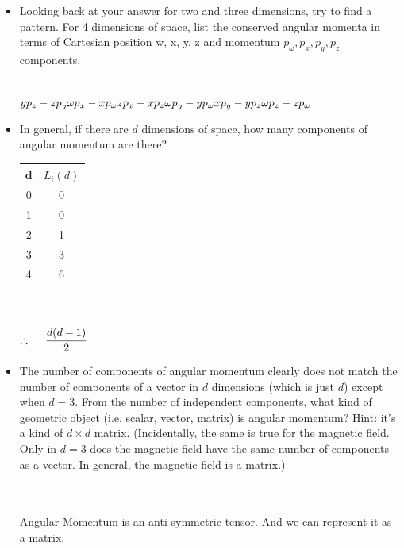 \documentclass[fleqn]{article}
\begin{document}
\begin{enumerate}
\begin{itemize}
      \item Looking back at your answer for two and three dimensions, try
      to find a pattern. For 4 dimensions of space, list the conserved
      angular momenta in terms of Cartesian position w, x, y, z and momentum $p_{\omega}, p_x, p_y,p_z$ components.

        \textcolor{hwColor}{
          \\
          $
            y p_z-z p_y \omega p_x-x p_{\omega}
            \\
            \\
            z p_x -x p_z \omega p_y - y p_{\omega}
            \\
            \\
            x p_y -y p_z \omega p_z -z p_{\omega}
          $
          \\
        }
  
      \item In general, if there are $d$ dimensions of space, how many components of angular momentum are there?

        \textcolor{hwColor}{
          \begin{center}
            \begin{tabular}{ c|c }
             d & $L_i(d)$ \\ 
             \hline
             0 & 0 \\  
             1 & 0 \\  
             2 & 1 \\  
             3 & 3 \\  
             4 & 6     
            \end{tabular}
          \end{center}
        }

        \textcolor{hwColor}{
          \\
          \\
          $
            \therefore ~~~~ \dfrac{d(d-1)}{2} \\ \\
          $
        }

      \item The number of components of angular momentum clearly does not match the number of components of a vector in $d$ dimensions
      (which is just $d$) except when $d=3$. From the number of independent components, what kind of geometric object (i.e. scalar,
      vector, matrix) is angular momentum?
      Hint: it’s a kind of $d \times d$ matrix. (Incidentally, the same is true for the magnetic field. Only 
      in $d=3$ does the magnetic field have the same number of components as a vector. In general, the magnetic field is a matrix.)
    
        \textcolor{hwColor}{
          \\
          \\
          Angular  Momentum  is an anti-symmetric tensor. And we can represent it as a matrix. 
        }

    \end{itemize}
    
  \end{enumerate}
\end{document}
